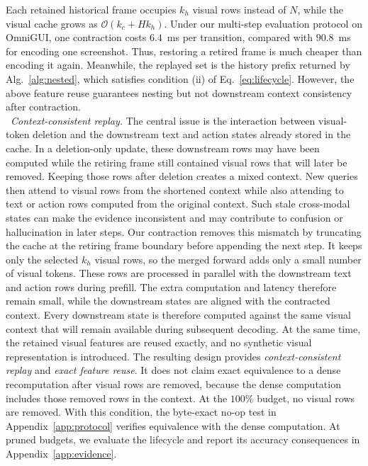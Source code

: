 %
Each retained historical frame occupies $k_h$ visual rows instead of $N$, while the visual cache grows as $\mathcal{O}(k_c+Hk_h)$.
%
Under our multi-step evaluation protocol on OmniGUI, one contraction costs $6.4$\ ms per transition, compared with $90.8$\ ms for encoding one screenshot.
%
Thus, restoring a retired frame is much cheaper than encoding it again.
%
Meanwhile, the replayed set is the history prefix returned by Alg.~\ref{alg:nested}, which satisfies condition (ii) of Eq.~\ref{eq:lifecycle}.
%
However, the above feature reuse guarantees nesting but not downstream context consistency after contraction.
\\
\noindent{}~\textit{Context-consistent replay.}
The central issue is the interaction between visual-token deletion and the downstream text and action states already stored in the cache.
%
In a deletion-only update, these downstream rows may have been computed while the retiring frame still contained visual rows that will later be removed.
%
Keeping those rows after deletion creates a mixed context.
%
New queries then attend to visual rows from the shortened context while also attending to text or action rows computed from the original context.
%
Such stale cross-modal states can make the evidence inconsistent and may contribute to confusion or hallucination in later steps.
%
Our contraction removes this mismatch by truncating the cache at the retiring frame boundary before appending the next step.
%
It keeps only the selected $k_h$ visual rows, so the merged forward adds only a small number of visual tokens.
%
These rows are processed in parallel with the downstream text and action rows during prefill.
%
The extra computation and latency therefore remain small, while the downstream states are aligned with the contracted context.
%
Every downstream state is therefore computed against the same visual context that will remain available during subsequent decoding.
%
At the same time, the retained visual features are reused exactly, and no synthetic visual representation is introduced.
%
The resulting design provides \emph{context-consistent replay} and \emph{exact feature reuse}.
%
It does not claim exact equivalence to a dense recomputation after visual rows are removed, because the dense computation includes those removed rows in the context.
%
At the $100\%$ budget, no visual rows are removed.
%
With this condition, the byte-exact no-op test in Appendix~\ref{app:protocol} verifies equivalence with the dense computation.
%
At pruned budgets, we evaluate the lifecycle and report its accuracy consequences in Appendix~\ref{app:evidence}.


